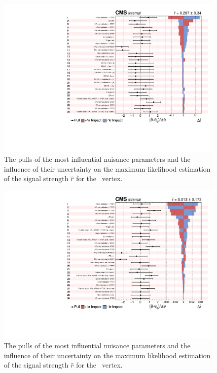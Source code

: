 \begin{figure}[htbp] 
	\centering
	  \includegraphics[page=1,width=1.\linewidth,keepaspectratio]{6_Search/Figures/impact/171122Zut.pdf}
	\caption{The pulls of the most influential  nuisance parameters and the influence of their uncertainty on the maximum likelihood estimation of the signal strength $\hat{r}$ for the \Zut\ vertex.}
	\label{fig:impactsZut1}
\end{figure}




\begin{figure}[htbp] 
	\centering
	\includegraphics[page=1,width=1.\linewidth,keepaspectratio]{6_Search/Figures/impact/171122Zct.pdf}
	\caption{The pulls of the most influential nuisance parameters and the influence of their uncertainty on the maximum likelihood estimation of the signal strength $\hat{r}$ for the \Zct\ vertex.}
	\label{fig:impactsZct1}
\end{figure}


